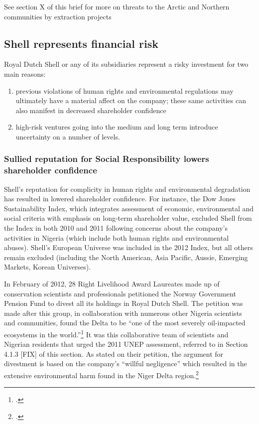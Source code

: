 \begin{vcom}
See section X of this brief for more on threats to the Arctic and Northern communities by extraction projects
\end{vcom}



	\subsection{Shell represents financial risk}
	


Royal Dutch Shell or any of its subsidiaries represent a risky investment for two main reasons:
\begin{enumerate}
	\item previous violations of human rights and environmental regulations may ultimately have a material affect on the company; these same activities can also manifest in decreased shareholder confidence
	\item high-risk ventures going into the medium and long term introduce uncertainty on a number of levels.
\end{enumerate}

	
	
	\subsubsection{Sullied reputation for Social Responsibility lowers shareholder confidence}
	
	
	
Shell's reputation for complicity in human rights and environmental degradation has resulted in lowered shareholder confidence. 
For instance, the Dow Jones Sustainability Index, which integrates assessment of economic, environmental and social criteria with emphasis on long-term shareholder value, excluded Shell from the Index in both 2010 and 2011 following concerns about the company's activities in Nigeria (which include both human rights and environmental abuses). 
Shell's European Universe was included in the 2012 Index, but all others remain excluded (including the North American, Asia Pacific, Aussie, Emerging Markets, Korean Universes).



In February of 2012, 28 Right Livelihood Award Laureates made up of conservation scientists and professionals petitioned the Norway Government Pension Fund to divest all its holdings in Royal Dutch Shell. 
The petition was made after this group, in collaboration with numerous other Nigeria scientists and communities, found the Delta to be ``one of the most severely oil-impacted ecosystems in the world.''\footcite[][]{NigerDeltaReport_2006}
It was this collaborative team of scientists and Nigerian residents that urged the 2011 UNEP assessment, referred to in Section 4.1.3 [FIX] of this section. 
As stated on their petition, the argument for divestment is based on the company's ``willful negligence'' which resulted in the extensive environmental harm found in the Niger Delta region.\footcite[][]{NorwayPetition_2012}



